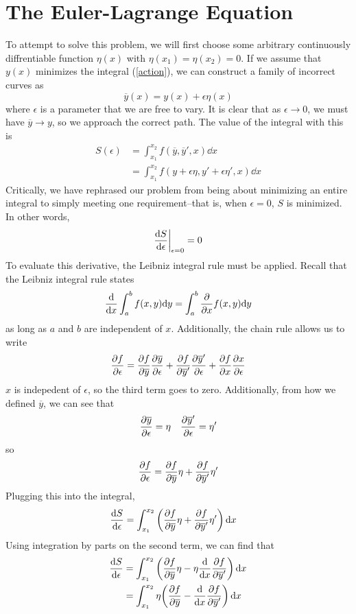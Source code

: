 \section{The Euler-Lagrange Equation}
To attempt to solve this problem, we will first choose some arbitrary continuously diffrentiable function $\eta(x)$ with $\eta(x_1) = \eta(x_2) = 0$. If we assume that $y(x)$ minimizes the integral (\ref{action}), we can construct a family of incorrect curves as
\[ \overline y(x) = y(x) + \epsilon \eta(x) \]
where $\epsilon$ is a parameter that we are free to vary. It is clear that as $\epsilon \to 0$, we must have $\overline y \to y$, so we approach the correct path. The value of the integral with this is
\begin{align*}
    S(\epsilon) &= \int_{x_1}^{x_2} f(\overline y, \overline y', x)\dd x \\
    &= \int_{x_1}^{x_2} f(y + \epsilon \eta, y' + \epsilon \eta', x)\dd x
\end{align*}
Critically, we have rephrased our problem from being about minimizing an entire integral to simply meeting one requirement--that is, when $\epsilon = 0$, $S$ is minimized. In other words,
\[ \dv{S}{\epsilon}\biggr|_{\epsilon = 0} = 0\]
To evaluate this derivative, the Leibniz integral rule must be applied. Recall that the Leibniz integral rule states
\[ \dv{x} \int_a^b f(x, y)\dd y = \int_a^b \pdv{x} f(x,y)\dd y\]
as long as $a$ and $b$ are independent of $x$. Additionally, the chain rule allows us to write
\[ \pdv{f}{\epsilon} = \pdv{f}{\overline y}\pdv{\overline y}{\epsilon} + \pdv{f}{\overline y'}\pdv{\overline y'}{\epsilon} + \pdv{f}{x}\pdv{x}{\epsilon}\]
$x$ is indepedent of $\epsilon$, so the third term goes to zero. Additionally, from how we defined $\overline y$, we can see that
\[ \pdv{\overline y}{\epsilon} = \eta \quad \pdv{\overline y'}{\epsilon} = \eta '\]
so
\[ \pdv{f}{\epsilon} = \pdv{f}{\overline y}\eta + \pdv{f}{\overline y'}\eta '\]
Plugging this into the integral,
\begin{align*}
    \dv{S}{\epsilon} &= \int_{x_1}^{x_2} \pqty{\pdv{f}{\overline y}\eta + \pdv{f}{\overline y'}\eta '} \, \dd x
\end{align*}
Using integration by parts on the second term, we can find that
\begin{align*}
    \dv{S}{\epsilon} &= \int_{x_1}^{x_2} \pqty{\pdv{f}{\overline y}\eta - \eta \dv{x}\pdv{f}{\overline y'}} \, \dd x\\
    &= \int_{x_1}^{x_2} \eta \pqty{\pdv{f}{\overline y} - \dv{x} \pdv{f}{\overline y'}}\, \dd x
\end{align*}
